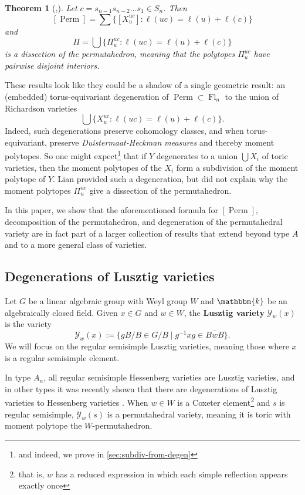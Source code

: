 \documentclass[11pt]{amsart}
\newtheorem{theorem}[Thm]{Theorem}
\theoremstyle{definition}
\DeclareMathOperator{\Perm}{Perm}
\DeclareMathOperator{\Fl}{Fl}
\newcommand\defn[1]{{\bf #1}}
\newcommand\calY{{\mathcal Y}}
\begin{document}
 \begin{theorem}[{\cite[Eq. (14)]{AT10},\cite[Theorem 5.4]{HHMP19}}]\label{thm:prior-work}
 	Let $c=s_{n-1}s_{n-2} \dots s_1 \in S_n$. Then 
 	\[[\Perm] = \sum \{[X_u^{uc}]: \ell(uc) = \ell(u) + \ell(c)\} \]
 	and 
 	\[\Pi = \bigcup \{\Pi_u^{uc} :\ell(uc) = \ell(u) + \ell(c) \}\]
 	is a dissection of the permutahedron, meaning that the polytopes $\Pi_u^{uc}$ have pairwise disjoint interiors.
 \end{theorem}

These results look like they could be a shadow of a single geometric result: an (embedded) torus-equivariant degeneration of $\Perm \subset \Fl_n$ to the union of Richardson varieties
\[\bigcup \{X_u^{uc}: \ell(uc) = \ell(u) + \ell(c)\}.\]
Indeed, such degenerations preserve cohomology classes, and when
torus-equivariant, preserve {\em Duistermaat-Heckman measures} and thereby
moment polytopes. 
So one might expect\footnote{and indeed, we prove in \cref{sec:subdiv-from-degen}} that if $Y$ degenerates to a union $\bigcup X_i$ of toric varieties, then the moment polytopes of the $X_i$ form a  subdivision of the moment polytope of $Y$. 
Lian \cite{Lian24} provided such a degeneration, but did not explain why the moment polytopes $\Pi_u^{uc}$ give a dissection
of the permutahedron.



In this paper, we show that the aforementioned formula for $[\Perm]$,
decomposition of the permutahedron, and degeneration of the
permutahedral variety are in fact part of a larger collection of
results that extend beyond type $A$ and to a more general class of
varieties.

\subsection{Degenerations of Lusztig varieties} 

  
  Let $G$ be a linear algebraic group with Weyl group $W$ and
$\mathbbm{k}$ be an algebraically closed field. Given $x \in G$ and
$w \in W$, the \defn{Lusztig variety} $\mathcal{Y}_w(x)$ is the
variety
 \[\calY_w(x) := \{gB/B \in G/B \; \lvert \; g^{-1} x g \in \overline{BwB}\}.\]
We will focus on the regular semisimple Lusztig varieties,
meaning those where $x$ is a regular semisimple element.

In type $A_n$, all regular semisimple Hessenberg varieties are Lusztig
varieties, and in other types it was recently shown that there are
degenerations of Lusztig varieties to Hessenberg varieties
\cite{BHL25-geomLusztig}. When $w \in W$ is a Coxeter
element\footnote{that is, $w$ has a reduced expression in which each
  simple reflection appears exactly once} and $s$ is regular
semisimple, $\calY_w(s)$ is a permutahedral variety, meaning it is
toric with moment polytope the $W$-permutahedron.
\end{document}
